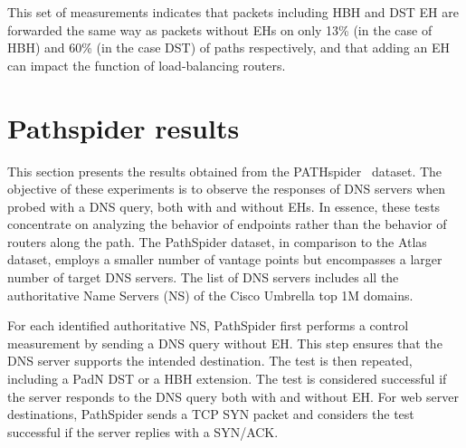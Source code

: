 \documentclass[conference]{IEEEtran}
\begin{document}
This set of measurements indicates that packets including HBH and DST EH are forwarded the same way as packets without EHs on only 13\% (in the case of HBH) and 60\% (in the case DST) of paths respectively, and that adding an EH can impact the function of load-balancing routers.
 
\section{Pathspider results} 
\label{sec:pathspider-results}

This section presents the results obtained from the
PATHspider~\cite{learmonth2016pathspider} dataset. The objective of these
experiments is to observe the responses of DNS servers when probed with a DNS
query, both with and without EHs. In essence, these tests concentrate on
analyzing the behavior of endpoints rather than the behavior of routers along
the path. The PathSpider dataset, in comparison to the Atlas dataset, employs a
smaller number of vantage points but encompasses a larger number of target DNS
servers. The list of DNS servers includes all the authoritative Name Servers (NS) of the Cisco
Umbrella top 1M domains.

For each identified authoritative NS, PathSpider first performs a control
measurement by sending a DNS query without EH.  This step ensures that the DNS
server supports the intended destination. The test is then repeated, including
a PadN DST or a HBH extension. The test is considered successful if the server
responds to the DNS query both with and without EH. For web server
destinations, PathSpider sends a TCP SYN packet and considers the test
successful if the server replies with a SYN/ACK.

\end{document}
